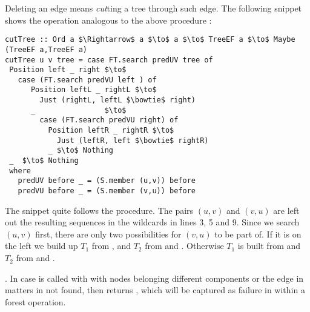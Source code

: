 Deleting an edge means \emph{cut}ting a tree through such edge. The following snippet shows the  operation analogous to the above procedure :
\begin{lstlisting}[mathescape]
cutTree :: Ord a $\Rightarrow$ a $\to$ a $\to$ TreeEF a $\to$ Maybe (TreeEF a,TreeEF a) 
cutTree u v tree = case FT.search predUV tree of
 Position left _ right $\to$
   case (FT.search predVU left ) of
      Position leftL _ rightL $\to$  
        Just (rightL, leftL $\bowtie$ right)
      _                $\to$                    
        case (FT.search predVU right) of
          Position leftR _ rightR $\to$
            Just (leftR, left $\bowtie$ rightR)
          _ $\to$ Nothing 
 _  $\to$ Nothing  
 where
   predUV before _ = (S.member (u,v)) before 
   predVU before _ = (S.member (v,u)) before 
\end{lstlisting}

The snippet quite follows the procedure. The pairs $(u,v)$ and $(v,u)$ are left out the resulting sequences in the wildcards in lines 3, 5 and 9. Since we search $(u,v)$ first, there are only two possibilities for $(v,u)$ to be part of. If it is on the left we build up $T_1$ from , and $T_2$ from  and . Otherwise $T_1$ is built from  and $T_2$ from  and .

. In case  is called with with nodes belonging different components or the edge in matters in not found, then  returns , which will be captured as failure in \cut within a forest operation.



